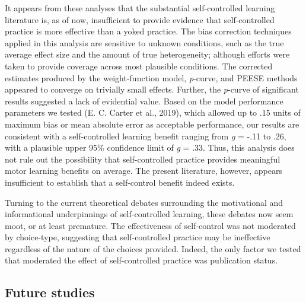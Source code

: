 \documentclass[
  english,
  man, donotrepeattitle,floatsintext]{apa7}
\begin{document}
It appears from these analyses that the substantial self-controlled learning literature is, as of now, insufficient to provide evidence that self-controlled practice is more effective than a yoked practice. The bias correction techniques applied in this analysis are sensitive to unknown conditions, such as the true average effect size and the amount of true heterogeneity; although efforts were taken to provide coverage across most plausible conditions. The corrected estimates produced by the weight-function model, \emph{p}-curve, and PEESE methods appeared to converge on trivially small effects. Further, the \emph{p}-curve of significant results suggested a lack of evidential value. Based on the model performance parameters we tested (E. C. Carter et al., 2019), which allowed up to .15 units of maximum bias or mean absolute error as acceptable performance, our results are consistent with a self-controlled learning benefit ranging from \emph{g} = -.11 to .26, with a plausible upper 95\% confidence limit of \emph{g} = .33. Thus, this analysis does not rule out the possibility that self-controlled practice provides meaningful motor learning benefits on average. The present literature, however, appears insufficient to establish that a self-control benefit indeed exists.

Turning to the current theoretical debates surrounding the motivational and informational underpinnings of self-controlled learning, these debates now seem moot, or at least premature. The effectiveness of self-control was not moderated by choice-type, suggesting that self-controlled practice may be ineffective regardless of the nature of the choices provided. Indeed, the only factor we tested that moderated the effect of self-controlled practice was publication status.

\hypertarget{future-studies}{%
\subsection{Future studies}\label{future-studies}}
\end{document}
